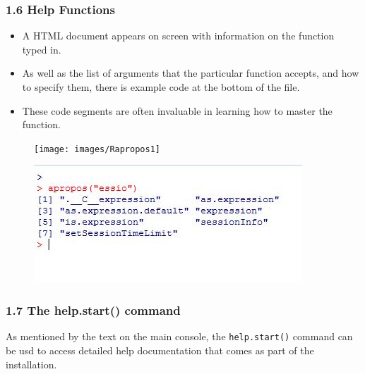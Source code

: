  
 
 
 \frametitle{1.6 Help Functions}
 \begin{itemize}
 \item A HTML document appears on screen with information on the function typed in. 
 \item As well
 as the list of arguments that the particular function accepts, and how to specify them, there is
 example code at the bottom of the file. 
 \item These code segments are often invaluable in learning
 how to master the function.
 \end{itemize}
 
 
 
 
 
 
 \begin{figure}
 \centering
 \texttt{[image: images/Rapropos1]}       
 \end{figure}
    
 
 \begin{figure}
 \centering
 \includegraphics[width=0.7\linewidth]{images/Rapropos2}       
 \end{figure}
    
 
 
 
 \frametitle{1.7 The help.start() command}
 As mentioned by the text on the main console, the \texttt{help.start()} command can be usd to
 access detailed help documentation that comes as part of the installation.
 
 
